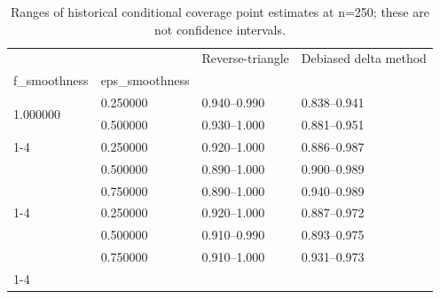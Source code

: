 \begin{table}
\caption{Ranges of historical conditional coverage point estimates at n=250; these are not confidence intervals.}
\label{tab:experiment_details_additional_coverage_summary_N250}
\begin{tabular}{llll}
\toprule
 &  & Reverse-triangle & Debiased delta method \\
f_smoothness & eps_smoothness &  &  \\
\midrule
\multirow[t]{2}{*}{1.000000} & 0.250000 & 0.940--0.990 & 0.838--0.941 \\
 & 0.500000 & 0.930--1.000 & 0.881--0.951 \\
\cline{1-4}
\multirow[t]{3}{*}{1.500000} & 0.250000 & 0.920--1.000 & 0.886--0.987 \\
 & 0.500000 & 0.890--1.000 & 0.900--0.989 \\
 & 0.750000 & 0.890--1.000 & 0.940--0.989 \\
\cline{1-4}
\multirow[t]{3}{*}{2.000000} & 0.250000 & 0.920--1.000 & 0.887--0.972 \\
 & 0.500000 & 0.910--0.990 & 0.893--0.975 \\
 & 0.750000 & 0.910--1.000 & 0.931--0.973 \\
\cline{1-4}
\bottomrule
\end{tabular}
\end{table}
